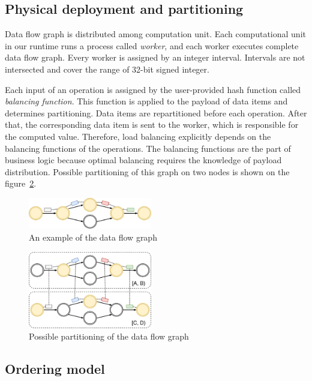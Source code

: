 \subsection{Physical deployment and partitioning}
Data flow graph is distributed among computation unit. Each computational unit in our runtime runs a process called {\it worker}, and each worker executes complete data flow graph. Every worker is assigned by an integer interval. Intervals are not intersected and cover the range of 32-bit signed integer.

Each input of an operation is assigned by the user-provided hash function called {\it balancing function}. This function is applied to the payload of data items and determines partitioning. Data items are repartitioned before each operation. After that, the corresponding data item is sent to the worker, which is responsible for the computed value. Therefore, load balancing explicitly depends on the balancing functions of the operations. The balancing functions are the part of business logic because optimal balancing requires the knowledge of payload distribution. Possible partitioning of this graph on two nodes is shown on the figure~\ref{physical-graph-figure}.

\begin{figure}[htbp]
  \centering
  \includegraphics[width=0.48\textwidth]{pics/logical-graph}
  \caption{An example of the data flow graph}
  \label {logical-graph-figure}
\end{figure}

\begin{figure}[htbp]
  \centering
  \includegraphics[width=0.48\textwidth]{pics/physical-graph}
  \caption{Possible partitioning of the data flow graph}
  \label {physical-graph-figure}
\end{figure}

\subsection{Ordering model}

